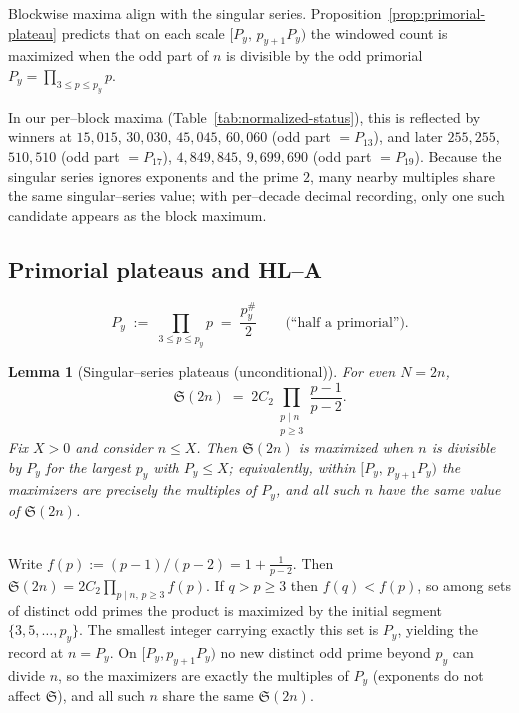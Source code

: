 \documentclass[11pt]{article}
\makeatletter
\theoremstyle{inline}
\theoremstyle{break}
\newtheorem{lemma}{Lemma}
\renewenvironment{proof}[1][\proofname]{%
  \par\pushQED{\qed}%
  \normalfont \topsep6\p@\@plus6\p@\relax
  \trivlist
  \item[\hskip\labelsep
        \itshape
    #1\@addpunct{.}]\mbox{}\\  %
}{%
  \popQED\endtrivlist\@endpefalse
}
\theoremstyle{break}
\theoremstyle{break}
\theoremstyle{break}
\theoremstyle{break}
\theoremstyle{break}
\theoremstyle{break}
\theoremstyle{inline}
\makeatother
\begin{document}
Blockwise maxima align with the singular series.  Proposition~\ref{prop:primorial-plateau} predicts that on each scale \([P_y,\,p_{y+1}P_y)\) the windowed count is maximized when the odd part of \(n\) is divisible by the odd primorial \(P_y=\prod_{3\le p\le p_y}p\).

In our per–block maxima (Table~\ref{tab:normalized-status}), this is reflected by winners at 
\(15{,}015\), \(30{,}030\), \(45{,}045\), \(60{,}060\) (odd part \(=P_{13}\)), 
and later \(255{,}255\), \(510{,}510\) (odd part \(=P_{17}\)), 
\(4{,}849{,}845\), \(9{,}699{,}690\) (odd part \(=P_{19}\)).
Because the singular series ignores exponents and the prime \(2\), many nearby multiples share the same singular–series value; with per–decade decimal recording, only one such candidate appears as the block maximum.


\subsection{Primorial plateaus and HL–A}\label{sec:primorial-prop}

\begin{equation}\label{eq:half-primorial}
P_y \;:=\; \prod_{3\le p\le p_y} p \;=\; \frac{p_y^\#}{2}\qquad\text{(``half a primorial'')}.
\end{equation}

\begin{lemma}[Singular–series plateaus (unconditional)]\label{lem:SS-plateau}
For even $N=2n$,
\begin{equation}\label{eq:sing-series-2n}
\mathfrak S(2n)\;=\;2C_2 \prod_{\substack{p\mid n\\ p\ge 3}}\frac{p-1}{p-2}.
\end{equation}
Fix $X>0$ and consider $n\le X$. Then $\mathfrak S(2n)$ is maximized when $n$ is divisible by $P_y$ for the largest $p_y$ with $P_y\le X$; equivalently, within $[P_y,\,p_{y+1}P_y)$ the maximizers are precisely the multiples of $P_y$, and all such $n$ have the same value of $\mathfrak S(2n)$.
\end{lemma}

\begin{proof}
Write $f(p):=(p-1)/(p-2)=1+\frac{1}{p-2}$. Then
\(\mathfrak S(2n)=2C_2\prod_{p\mid n,\,p\ge 3} f(p)\).
If $q>p\ge 3$ then $f(q)<f(p)$, so among sets of distinct odd primes the product is maximized by the initial segment $\{3,5,\dots,p_y\}$. The smallest integer carrying exactly this set is $P_y$, yielding the record at $n=P_y$. On $[P_y,p_{y+1}P_y)$ no new distinct odd prime beyond $p_y$ can divide $n$, so the maximizers are exactly the multiples of $P_y$ (exponents do not affect $\mathfrak S$), and all such $n$ share the same $\mathfrak S(2n)$. 
\end{proof}
\end{document}

